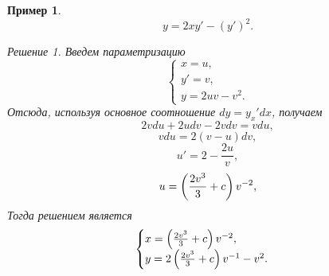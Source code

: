 \documentclass[a5paper, 11pt]{article}
\theoremstyle{definition}
\theoremstyle{plain}
\newtheorem{Ex}{Пример}
\theoremstyle{remark}
\newtheorem*{Solution}{Решение}
\begin{document}
	\begin{Ex}
		\[
		y=2xy'-(y')^2.
		\]
		\begin{Solution}
			Введем параметризацию 
			\[
			\begin{cases}
				x = u,\\
				y'=v,\\
				y=2uv-v^2.			
			\end{cases}
			\]
			Отсюда, используя основное соотношение $dy = y_x' dx$, получаем
			\[
				2vdu + 2udv - 2vdv = v du,
			\]
			\[
				vdu = 2(v-u)dv,
			\]
			\[
				u' = 2-\frac{2u}{v},
			\]
			\[
				u= \left(\frac{2v^3}{3} + c\right)v^{-2},
			\]
			Тогда решением является
			\[
				\begin{cases}
				x=\left(\frac{2v^3}{3} + c\right)v^{-2},\\
				y = 2\left(\frac{2v^3}{3} + c\right)v^{-1} - v^2.
				\end{cases}
			\]
		\end{Solution}
	\end{Ex}
	
\end{document}
